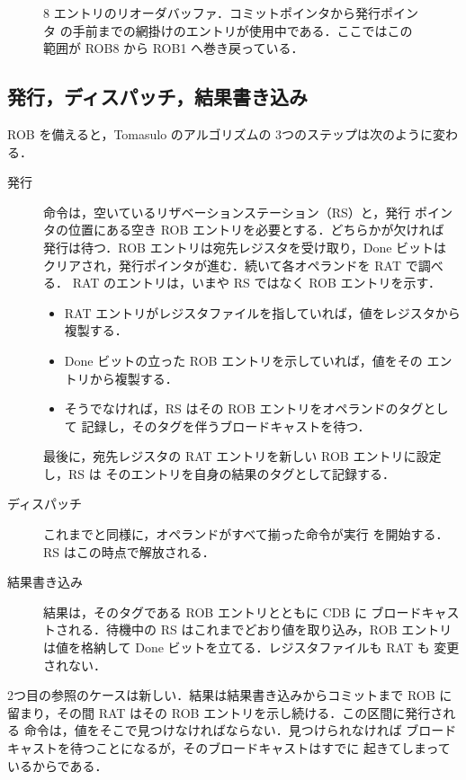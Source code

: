 \documentclass[../main.tex]{subfiles}
\begin{document}
\begin{figure}[htbp]
  \centering
  
  \caption{8 エントリのリオーダバッファ．コミットポインタから発行ポインタ
    の手前までの網掛けのエントリが使用中である．ここではこの範囲が ROB8
    から ROB1 へ巻き戻っている．}
  \label{fig:l08-rob}
\end{figure}

\subsection{発行，ディスパッチ，結果書き込み}

ROB を備えると，Tomasulo のアルゴリズムの 3つのステップは次のように変わる．%
\begin{description}
  \item[発行] 命令は，空いているリザベーションステーション（RS）と，発行
    ポインタの位置にある空き ROB エントリを必要とする．どちらかが欠ければ
    発行は待つ．ROB エントリは宛先レジスタを受け取り，Done ビットは
    クリアされ，発行ポインタが進む．続いて各オペランドを RAT で調べる．
    RAT のエントリは，いまや RS ではなく ROB エントリを示す．
    \begin{itemize}
      \item RAT エントリがレジスタファイルを指していれば，値をレジスタから
        複製する．
      \item Done ビットの立った ROB エントリを示していれば，値をその
        エントリから複製する．
      \item そうでなければ，RS はその ROB エントリをオペランドのタグとして
        記録し，そのタグを伴うブロードキャストを待つ．
    \end{itemize}
    最後に，宛先レジスタの RAT エントリを新しい ROB エントリに設定し，RS は
    そのエントリを自身の結果のタグとして記録する．
  \item[ディスパッチ] これまでと同様に，オペランドがすべて揃った命令が実行
    を開始する．RS はこの時点で解放される．
  \item[結果書き込み] 結果は，そのタグである ROB エントリとともに CDB に
    ブロードキャストされる．待機中の RS はこれまでどおり値を取り込み，ROB
    エントリは値を格納して Done ビットを立てる．レジスタファイルも RAT も
    変更されない．
\end{description}

2つ目の参照のケースは新しい．結果は結果書き込みからコミットまで ROB に
留まり，その間 RAT はその ROB エントリを示し続ける．この区間に発行される
命令は，値をそこで見つけなければならない．見つけられなければ
ブロードキャストを待つことになるが，そのブロードキャストはすでに
起きてしまっているからである．
\end{document}
